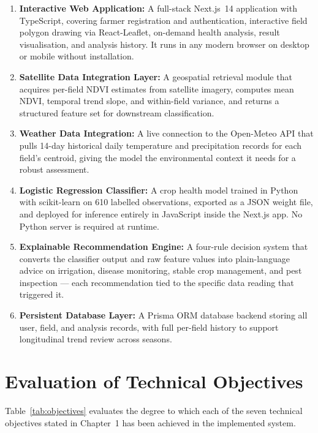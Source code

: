 \begin{enumerate}
  \item \textbf{Interactive Web Application:} A full-stack Next.js~14 application with TypeScript, covering farmer registration and authentication, interactive field polygon drawing via React-Leaflet, on-demand health analysis, result visualisation, and analysis history. It runs in any modern browser on desktop or mobile without installation.

  \item \textbf{Satellite Data Integration Layer:} A geospatial retrieval module that acquires per-field NDVI estimates from satellite imagery, computes mean NDVI, temporal trend slope, and within-field variance, and returns a structured feature set for downstream classification.

  \item \textbf{Weather Data Integration:} A live connection to the Open-Meteo API that pulls 14-day historical daily temperature and precipitation records for each field's centroid, giving the model the environmental context it needs for a robust assessment.

  \item \textbf{Logistic Regression Classifier:} A crop health model trained in Python with scikit-learn on 610 labelled observations, exported as a JSON weight file, and deployed for inference entirely in JavaScript inside the Next.js app. No Python server is required at runtime.

  \item \textbf{Explainable Recommendation Engine:} A four-rule decision system that converts the classifier output and raw feature values into plain-language advice on irrigation, disease monitoring, stable crop management, and pest inspection — each recommendation tied to the specific data reading that triggered it.

  \item \textbf{Persistent Database Layer:} A Prisma ORM database backend storing all user, field, and analysis records, with full per-field history to support longitudinal trend review across seasons.
\end{enumerate}

\section{Evaluation of Technical Objectives}

Table~\ref{tab:objectives} evaluates the degree to which each of the seven technical objectives stated in Chapter~1 has been achieved in the implemented system.


